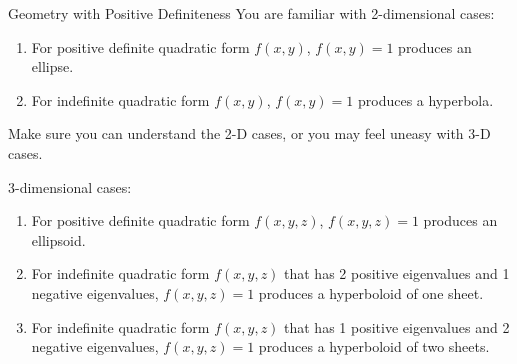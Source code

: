 \documentclass{beamer}
\begin{document}
\begin{frame}{Geometry with Positive Definiteness}
    You are familiar with 2-dimensional cases:
\begin{enumerate}
    \item For positive definite quadratic form $f(x,y)$, $f(x,y)=1$ produces an ellipse.
    \item For indefinite quadratic form $f(x,y)$, $f(x,y)=1$ produces a hyperbola.
\end{enumerate}

Make sure you can understand the 2-D cases, or you may feel uneasy with 3-D cases.

\vspace{3pt}
3-dimensional cases:
\begin{enumerate}
    \item For positive definite quadratic form $f(x,y,z)$, $f(x,y,z)=1$ produces an ellipsoid.
    \item For indefinite quadratic form $f(x,y,z)$ that has 2 positive eigenvalues and 1 negative eigenvalues, $f(x,y,z)=1$ produces a hyperboloid of one sheet.
    \item For indefinite quadratic form $f(x,y,z)$ that has 1 positive eigenvalues and 2 negative eigenvalues, $f(x,y,z)=1$ produces a hyperboloid of two sheets.
\end{enumerate}
\end{frame}
\end{document}
